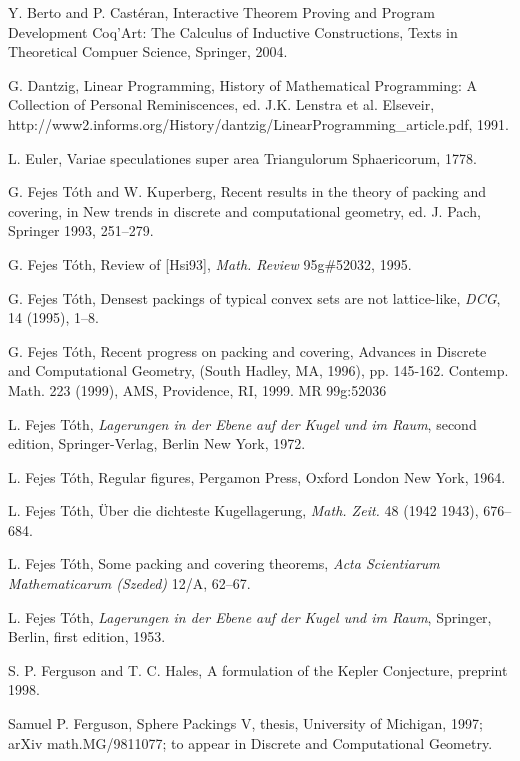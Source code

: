 \begin{thebibliography}{CHMS94}
 Y. Berto and P. Cast\'eran,
  Interactive Theorem Proving and Program Development Coq'Art: The Calculus
 of Inductive Constructions, Texts in Theoretical Compuer Science, Springer, 2004.

  G. Dantzig, Linear Programming, 
History of Mathematical Programming:
A Collection of Personal Reminiscences, ed. J.K. Lenstra et al.
Elseveir, http://www2.informs.org/History/dantzig/LinearProgramming\_article.pdf, 1991.

 L. Euler, Variae speculationes super area
Triangulorum Sphaericorum, 1778.

 G. Fejes T\'oth and W. Kuperberg, Recent results in the
    theory of packing and covering, in New trends in
    discrete and computational geometry, ed. J. Pach, Springer
    1993, 251--279.

 G. Fejes T\'oth, Review of [Hsi93], {\it Math. Review} 95g\#52032, 1995.

 G. Fejes T\'oth, Densest packings of typical convex sets
    are not lattice-like, {\it DCG}, 14 (1995), 1--8.

 G. Fejes T\'oth, Recent progress on packing and covering,
     Advances
in Discrete and Computational Geometry, (South Hadley, MA, 1996),
pp. 145-162. Contemp. Math. 223 (1999), AMS, Providence, RI, 1999.
MR 99g:52036

 L. Fejes T\'oth, {\it Lagerungen in der Ebene auf der
    Kugel und im Raum}, second edition,
    Springer-Verlag, Berlin New York, 1972.

 L. Fejes T\'oth, Regular figures, Pergamon Press,
    Oxford London New York, 1964.

 L. Fejes T\'oth,  \"Uber die dichteste Kugellagerung,
{\it Math. Zeit.} 48 (1942 1943), 676--684.

 L. Fejes T\'oth, Some packing and covering theorems,
    {\it Acta Scientiarum Mathematicarum (Szeded)} 12/A, 62--67.

 L. Fejes T\'oth, {\it Lagerungen in der Ebene auf
der Kugel und im Raum}, Springer, Berlin, first edition, 1953.

 S. P. Ferguson and T. C. Hales, A formulation of
the Kepler Conjecture, preprint 1998.

 Samuel P. Ferguson, Sphere
Packings V, thesis, University of Michigan,
    1997;  arXiv math.MG/9811077; to appear in Discrete and Computational
    Geometry.


\end{thebibliography}
